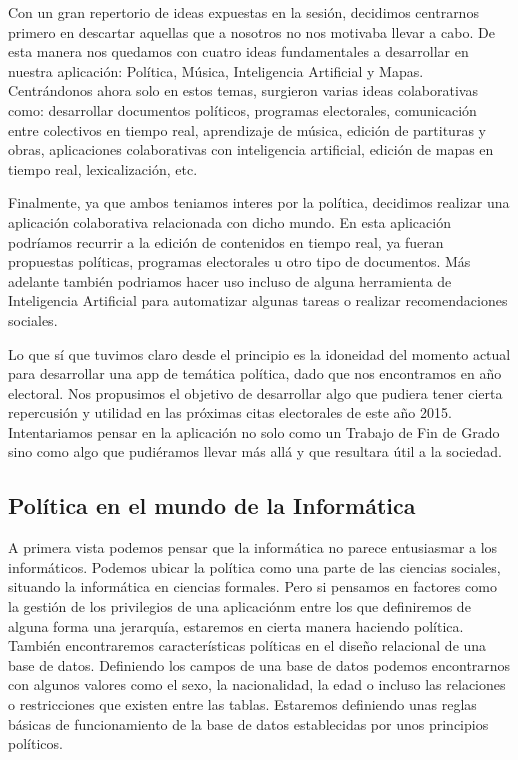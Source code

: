 Con un gran repertorio de ideas expuestas en la sesión, decidimos centrarnos primero en descartar aquellas que a nosotros no nos motivaba llevar a cabo. De esta manera nos quedamos con cuatro ideas fundamentales a desarrollar en nuestra aplicación: Política, Música, Inteligencia Artificial y Mapas. Centrándonos ahora solo en estos temas, surgieron varias ideas colaborativas como: desarrollar documentos políticos, programas electorales, comunicación entre colectivos en tiempo real, aprendizaje de música, edición de partituras y obras, aplicaciones colaborativas con inteligencia artificial, edición de mapas en tiempo real, lexicalización, etc.

Finalmente, ya que ambos teniamos interes por la política, decidimos realizar una aplicación colaborativa relacionada con dicho mundo. En esta aplicación podríamos recurrir a la edición de contenidos en tiempo real, ya fueran propuestas políticas, programas electorales u otro tipo de documentos. Más adelante también podriamos hacer uso incluso de alguna herramienta de Inteligencia Artificial para automatizar algunas tareas o realizar recomendaciones sociales.

Lo que sí que tuvimos claro desde el principio es la idoneidad del momento actual para desarrollar una app de temática política, dado que nos encontramos en año electoral. Nos propusimos el objetivo de desarrollar algo que pudiera tener cierta repercusión y utilidad en las próximas citas electorales de este año 2015. Intentariamos pensar en la aplicación no solo como un Trabajo de Fin de Grado sino como algo que pudiéramos llevar más allá y que resultara útil a la sociedad.

\subsection{Política en el mundo de la Informática}

A primera vista podemos pensar que la informática no parece entusiasmar a los informáticos. Podemos ubicar la política como una parte de las ciencias sociales, situando la informática en ciencias formales. Pero si pensamos en factores como la gestión de los privilegios de una aplicaciónm entre los que definiremos de alguna forma una jerarquía, estaremos en cierta manera haciendo política. También encontraremos características políticas en el diseño relacional de una base de datos. Definiendo los campos de una base de datos podemos encontrarnos con algunos valores como el sexo, la nacionalidad, la edad o incluso las relaciones o restricciones que existen entre las tablas. Estaremos definiendo unas reglas básicas de funcionamiento de la base de datos establecidas por unos principios políticos.

